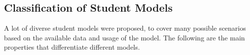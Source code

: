 

\subsection{Classification of Student Models}

A lot of diverse student models were proposed, to cover many possible scenarios
based on the available data and usage of the model. The following
are the main properties that differentiate different models.

